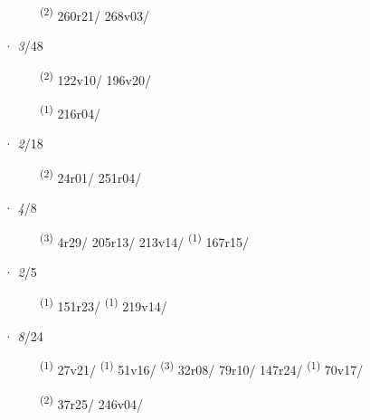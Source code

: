 \begin{description}
    \item[]  \textsuperscript{(2)} \mbox{260r21/} \mbox{268v03/}
\end{description}
\ENTRYEND
\noindent{} · \textit{3}/48 \LEMMALINE
\begin{description}
    \item[]  \textsuperscript{(2)} \mbox{122v10/} \mbox{196v20/}
    \item[]  \textsuperscript{(1)} \mbox{216r04/}
\end{description}
\ENTRYEND
\noindent{} · \textit{2}/18 \LEMMALINE
\begin{description}
    \item[]  \textsuperscript{(2)} \mbox{24r01/} \mbox{251r04/}
\end{description}
\ENTRYEND
\noindent{} · \textit{4}/8 \LEMMALINE
\begin{description}
    \item[]  \textsuperscript{(3)} \mbox{4r29/} \mbox{205r13/} \mbox{213v14/} \CASEBREAK {} \textsuperscript{(1)} \mbox{167r15/}
\end{description}
\ENTRYEND
\noindent{} · \textit{2}/5 \LEMMALINE
\begin{description}
    \item[]  \textsuperscript{(1)} \mbox{151r23/} \CASEBREAK {} \textsuperscript{(1)} \mbox{219v14/}
\end{description}
\ENTRYEND
\noindent{} · \textit{8}/24 \LEMMALINE
\begin{description}
    \item[]  \textsuperscript{(1)} \mbox{27v21/} \CASEBREAK {} \textsuperscript{(1)} \mbox{51v16/} \CASEBREAK {} \textsuperscript{(3)} \mbox{32r08/} \mbox{79r10/} \mbox{147r24/} \CASEBREAK {} \textsuperscript{(1)} \mbox{70v17/}
    \item[]  \textsuperscript{(2)} \mbox{37r25/} \mbox{246v04/}
\end{description}

